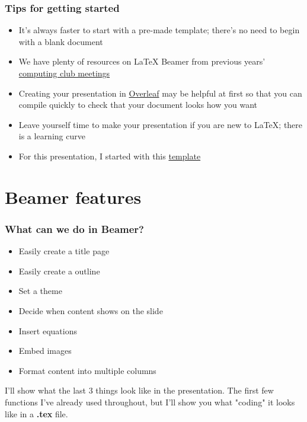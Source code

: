 \documentclass{beamer}
\begin{document}
\begin{frame}
\frametitle{Tips for getting started}

\begin{itemize}
    \item<1-> It's always faster to start with a pre-made template; there's no need to begin with a blank document
    \item<2-> We have plenty of resources on \LaTeX \hspace{0.05cm} Beamer from previous years' \alert{\href{https://cu-biostats-computing-club.org/resources.html}{computing club meetings }}
    \item<3-> Creating your presentation in \alert{\href{http://www.overleaf.com}{Overleaf}} may be helpful at first so that you can compile quickly to check that your document looks how you want
    \item<4-> Leave yourself time to make your presentation if you are new to \LaTeX; there is a learning curve
    \item<5> For this presentation, I started with this \alert{\href{https://www.overleaf.com/learn/latex/Beamer}{template}}
\end{itemize}

\end{frame}


\section{Beamer features}


\begin{frame}
\frametitle{What can we do in Beamer?}

\begin{itemize} 
    \item<1-> Easily create a title page \pause
    \item<2-> Easily create a outline \pause
    \item<3->Set a theme \pause
    \item<4-> Decide when content shows on the slide \pause
    \item<4-> Insert equations \pause
    \item<5-> Embed images \pause
    \item<6-> Format content into multiple columns \pause
\end{itemize} 
 
\hspace{1cm}
 
I'll show what the last 3 things look like in the presentation.  \pause The first few functions I've already used throughout, but I'll show you what "coding" it looks like in a \textbf{.tex} file.

\end{frame}
\end{document}
